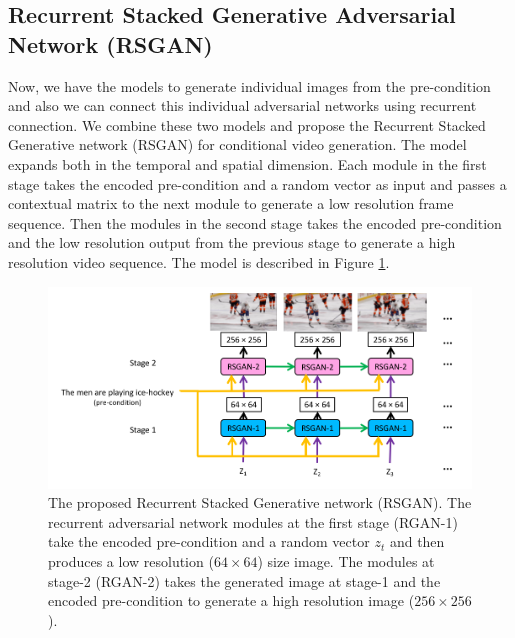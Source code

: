 \documentclass{article}
\begin{document}
\subsection{Recurrent Stacked Generative Adversarial Network (RSGAN)}
Now, we have the models to generate individual images from the pre-condition and also we can connect this individual adversarial networks using recurrent connection. We combine these two models and propose the Recurrent Stacked Generative network (RSGAN) for conditional video generation. The model expands both in the temporal and spatial dimension. Each module in the first stage takes the encoded pre-condition and a random vector as input and passes a contextual matrix to the next module to generate a low resolution frame sequence. Then the modules in the second stage takes the encoded pre-condition and the low resolution output from the previous stage to generate a high resolution video sequence. The model is described in Figure \ref{RSGAN}.

\begin{figure}[h]
  \centering
  \includegraphics[scale=0.7]{rsgan_only.png} 
  \caption{The proposed Recurrent Stacked Generative network (RSGAN). The recurrent adversarial network modules at the first stage (RGAN-1) take the encoded pre-condition and a random vector $z_t$ and then produces a low resolution ($64 \times 64$) size image. The modules at stage-2 (RGAN-2) takes the generated image at stage-1 and the encoded pre-condition to generate a high resolution image ($256 \times 256$).}
    \label{RSGAN}
\end{figure}


\end{document}

